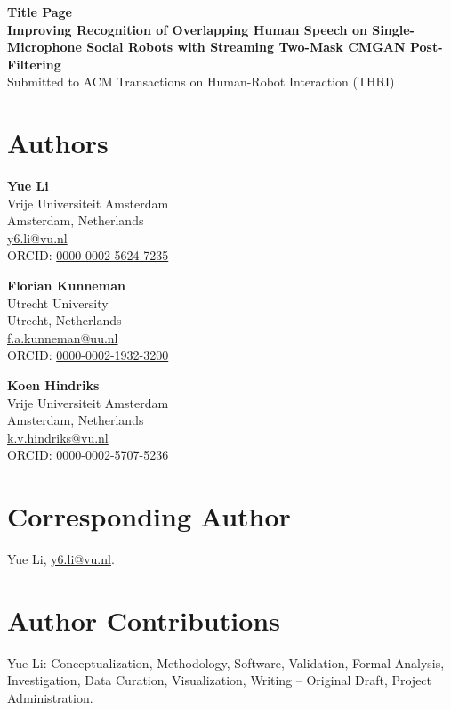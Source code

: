 \documentclass[11pt]{article}
\begin{document}
\begin{center}
{\Large\bfseries Title Page}\\[1.5em]
{\LARGE\bfseries Improving Recognition of Overlapping Human Speech on Single-Microphone Social Robots with Streaming Two-Mask CMGAN Post-Filtering}\\[1em]
{\large Submitted to ACM Transactions on Human-Robot Interaction (THRI)}
\end{center}

\vspace{1em}

\section*{Authors}

\textbf{Yue Li}\\
Vrije Universiteit Amsterdam\\
Amsterdam, Netherlands\\
\href{mailto:y6.li@vu.nl}{y6.li@vu.nl}\\
ORCID: \href{https://orcid.org/0000-0002-5624-7235}{0000-0002-5624-7235}

\textbf{Florian Kunneman}\\
Utrecht University\\
Utrecht, Netherlands\\
\href{mailto:f.a.kunneman@uu.nl}{f.a.kunneman@uu.nl}\\
ORCID: \href{https://orcid.org/0000-0002-1932-3200}{0000-0002-1932-3200}

\textbf{Koen Hindriks}\\
Vrije Universiteit Amsterdam\\
Amsterdam, Netherlands\\
\href{mailto:k.v.hindriks@vu.nl}{k.v.hindriks@vu.nl}\\
ORCID: \href{https://orcid.org/0000-0002-5707-5236}{0000-0002-5707-5236}

\section*{Corresponding Author}

Yue Li, \href{mailto:y6.li@vu.nl}{y6.li@vu.nl}.

\section*{Author Contributions}

Yue Li: Conceptualization, Methodology, Software, Validation, Formal Analysis,
Investigation, Data Curation, Visualization, Writing -- Original Draft, Project
Administration.
\end{document}
